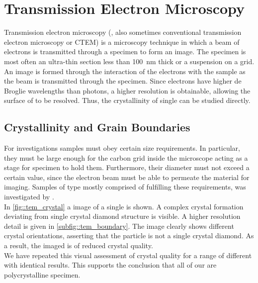 		\section{Transmission Electron Microscopy}{\label{sec::tem}}

			Transmission electron microscopy (\TEM, also sometimes conventional transmission electron microscopy or CTEM) is a microscopy technique in which a beam of electrons is transmitted through a specimen to form an image. The specimen is most often an ultra-thin section less than \SI{100}{\nm} thick or a suspension on a grid. An image is formed through the interaction of the electrons with the sample as the beam is transmitted through the specimen.
			Since electrons have higher de Broglie wavelengths than photons, a higher resolution is obtainable, allowing the surface of \nds to be resolved. Thus, the crystallinity of single \nds can be studied directly.


			\subsection{Crystallinity and Grain Boundaries}\label{subsection::tem_crystal}

				For \TEM investigations \nd samples must obey certain size requirements. 
				In particular, they must be large enough for the carbon grid inside the microscope acting as a stage for specimen to hold them. 
				Furthermore, their diameter must not exceed a certain value, since the \TEM electron beam must be able to permeate the material for imaging.
				Samples of type \insituH mostly comprised of \nds fulfilling these requirements, was investigated by \schmauch.
				\\
				In \autoref{fig::tem_crystal} a \TEM image of a single \nd is shown. A complex crystal formation deviating from single crystal diamond structure is visible. A higher resolution detail is given in \autoref{subfig::tem_boundary}. The image clearly shows different crystal orientations, asserting that the \nd particle is not a single crystal diamond. As a result, the imaged \nd is of reduced crystal quality.
				\\
				We have repeated this visual assessment of crystal quality for a range of different \nds with identical results. This supports the conclusion that all of our \nds are polycrystalline specimen.

